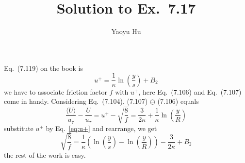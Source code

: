 \documentclass{article}
\title{Solution to Ex.~7.17}
\author{Yaoyu Hu}
\newcommand{\enangle}[1]{\langle {#1} \rangle}
\newcommand{\eqrefnew}[1]{Eq.~\eqref{#1}}
\begin{document}
\maketitle
Eq.~(7.119) on the book is
\begin{equation} \label{eq:u+}
	u^+ = \frac{1}{\kappa}\ln\left( \frac{y}{s} \right) + B_2
\end{equation}
we have to associate friction factor $f$ with $u^+$, here Eq.~(7.106) and Eq.~(7.107) come in handy. Considering Eq.~(7.104), (7.107) $\ominus$ (7.106) equals
\begin{equation} \label{eq:substracted}
	\frac{\enangle{U}}{u_{\tau}} - \frac{\bar{U}}{u_{\tau}} = u^+ - \sqrt{\frac{8}{f}} = \frac{3}{2\kappa} + \frac{1}{\kappa}\ln\left( \frac{y}{R} \right)
\end{equation}
substitute $u^+$ by \eqrefnew{eq:u+} and rearrange, we get
\begin{equation}
	\sqrt{\frac{8}{f}} = \frac{1}{\kappa}\left( \ln\left( \frac{y}{s} \right) - \ln\left( \frac{y}{R} \right) \right) - \frac{3}{2\kappa} + B_2
\end{equation}
the rest of the work is easy.
\end{document}
